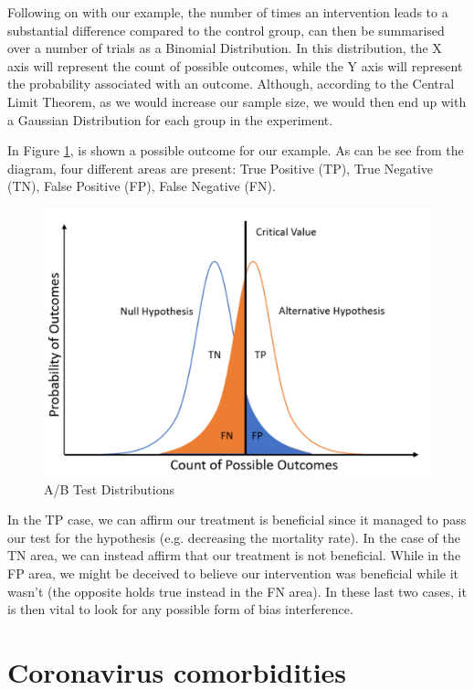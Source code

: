 Following on with our example, the number of times an intervention leads to a substantial difference compared to the control group, can then be summarised over a number of trials as a Binomial Distribution. In this distribution, the X axis will represent the count of possible outcomes, while the Y axis will represent the probability associated with an outcome. Although, according to the Central Limit Theorem, as we would increase our sample size, we would then end up with a Gaussian Distribution for each group in the experiment. 

In Figure \ref{test_dist}, is shown a possible outcome for our example. As can be see from the diagram, four different areas are present: True Positive (TP), True Negative (TN), False Positive (FP), False Negative (FN).
\vspace{-0.2cm}
\begin{figure}[ht!]%
    \centering
    \includegraphics[width=0.6\linewidth]{latex/images/abtest.pdf}
    \vspace{-0.2cm}
    \caption{A/B Test Distributions}
    \label{test_dist}
\end{figure}
\vspace{-0.6cm}

In the TP case, we can affirm our treatment is beneficial since it managed to pass our test for the hypothesis (e.g. decreasing the mortality rate). In the case of the TN area, we can instead affirm that our treatment is not beneficial. While in the FP area, we might be deceived to believe our intervention was beneficial while it wasn't (the opposite holds true instead in the FN area). In these last two cases, it is then vital to look for any possible form of bias interference.

\section{Coronavirus comorbidities}

